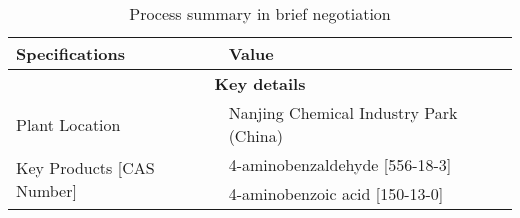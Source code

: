 \begin{landscape}

\begin{table}[]
\centering
\caption{Process summary in brief negotiation}
\label{tab:processsummary}
\begin{tabular}{@{}|l|l|l|@{}}
\toprule
\multicolumn{2}{|l|}{\textbf{Specifications}}                              & \textbf{Value}                                                                                                                                                                                                                                                                                                                                                                                                        \\ \midrule
\multicolumn{3}{|c|}{\textbf{Key details}}                                                                                                                                                                                                                                                                                                                                                                                                                                                         \\ \midrule
\multicolumn{2}{|l|}{Plant Location}                                       & Nanjing Chemical Industry Park (China)                                                                                                                                                                                                                                                                                                                                                                                \\ \midrule
\multicolumn{2}{|l|}{\multirow{3}{*}{Key Products {[}CAS Number{]}}}       & 4-aminobenzaldehyde {[}556-18-3{]}                                                                                                                                                                                                                                                                                                                                                                                    \\ \cmidrule(l){3-3} 
\multicolumn{2}{|l|}{}                                                     & 4-aminobenzoic acid {[}150-13-0{]}                                                                                                                                                                                                                                                                                                                                                                                    \\ \cmidrule(l){3-3} 

\end{tabular}
\end{table}
\end{landscape}
